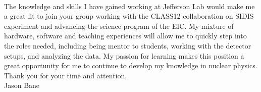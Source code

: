 \documentclass[12pt,letterpaper]{article}
\begin{document}
\paragraph{}The knowledge and skills I have gained working at Jefferson Lab would make me a great fit to join your group working with the CLASS12 collaboration on SIDIS experiment and advancing the science program of the EIC. My mixture of hardware, software and teaching experiences will allow me to quickly step into the roles needed, including being mentor to students, working with the detector setups, and analyzing the data. My passion for learning makes this position a great opportunity for me to continue to develop my knowledge in nuclear physics.      
\\

\noindent Thank you for your time and attention,\\
\noindent Jason Bane
\end{document}
